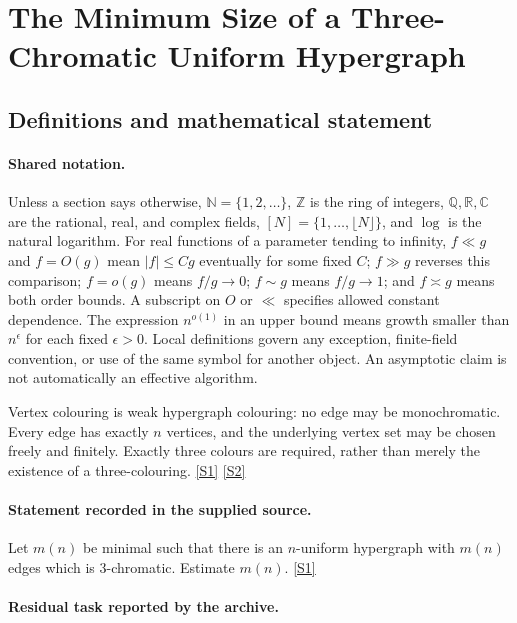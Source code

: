 \documentclass[11pt,a4paper]{article}
\newcommand{\N}{\mathbb{N}}
\newcommand{\Z}{\mathbb{Z}}
\newcommand{\Q}{\mathbb{Q}}
\newcommand{\R}{\mathbb{R}}
\newcommand{\C}{\mathbb{C}}
\newcommand{\sref}[2]{\hyperlink{source:#1:#2}{[S#2]}}
\begin{document}
\section{The Minimum Size of a Three-Chromatic Uniform Hypergraph}\label{statement}


\subsection{Definitions and mathematical statement}

\paragraph{Shared notation.}Unless a section says otherwise, $\N=\{1,2,\ldots\}$,
$\Z$ is the ring of integers, $\Q,\R,\C$ are the rational, real, and complex
fields, $[N]=\{1,\ldots,\lfloor N\rfloor\}$, and $\log$ is the natural
logarithm. For real functions of a parameter tending to infinity,
$f\ll g$ and $f=O(g)$ mean $|f|\leq Cg$ eventually for some fixed $C$;
$f\gg g$ reverses this comparison; $f=o(g)$ means $f/g\to0$;
$f\sim g$ means $f/g\to1$; and $f\asymp g$ means both order bounds.
A subscript on $O$ or $\ll$ specifies allowed constant dependence.
The expression $n^{o(1)}$ in an upper bound means growth smaller than
$n^\epsilon$ for each fixed $\epsilon>0$. Local definitions govern any
exception, finite-field convention, or use of the same symbol for another
object. An asymptotic claim is not automatically an effective algorithm.



Vertex colouring is weak hypergraph colouring: no edge may be monochromatic. Every edge has exactly $n$ vertices, and the underlying vertex set may be chosen freely and finitely. Exactly three colours are required, rather than merely the existence of a three-colouring. \sref{statement}{1} \sref{statement}{2}

\paragraph{Statement recorded in the supplied source.}
Let $m(n)$ be minimal such that there is an $n$-uniform hypergraph with $m(n)$ edges which is $3$-chromatic. Estimate $m(n)$. \sref{statement}{1}

\paragraph{Residual task reported by the archive.}
\end{document}
